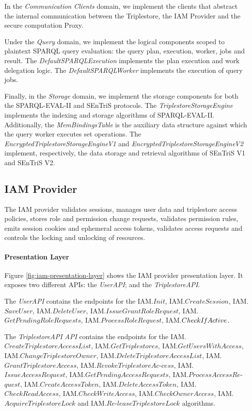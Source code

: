In the \emph{Communication Clients} domain, we implement the clients that abstract the internal communication between the Triplestore, the \gls{IAM} Provider and the secure computation Proxy.

Under the \emph{Query} domain, we implement the logical components scoped to plaintext \gls{SPARQL} query evaluation: the query plan, execution, worker, jobs and result. The \emph{DefaultSPARQLExecution} implements the plan execution and work delegation logic. The \emph{DefaultSPARQLWorker} implements the execution of query jobs.

Finally, in the \emph{Storage} domain, we implement the storage components for both the SPARQL-EVAL-II and \gls{SEnTriS} protocols. The \emph{TriplestoreStorageEngine} implements the indexing and storage algorithms of SPARQL-EVAL-II. Additionally, the \emph{MemBindingsTable} is the auxiliary data structure against which the query worker executes set operations.
The \emph{EncryptedTriplestoreStorageEngineV1} and \emph{EncryptedTriplestoreStorageEngineV2} implement, respectively, the data storage and retrieval algorithms of \gls{SEnTriS} V1 and \gls{SEnTriS} V2.

\subsection{IAM Provider} The \gls{IAM} provider validates sessions, manages user data and triplestore access policies, stores role and permission change requests, validates permission rules, emits session cookies and ephemeral access tokens, validates access requests and controls the locking and unlocking of resources.

\paragraph*{Presentation Layer} Figure \ref{fig:iam-presentation-layer} shows the \gls{IAM} provider presentation layer. It exposes two different \gls{API}s: the \emph{UserAPI}; and the \emph{TriplestoreAPI}.

The \emph{UserAPI} contains the endpoints for the IAM.$Init$, IAM.$CreateSession$, IAM.\linebreak$SaveUser$, IAM.$DeleteUser$, IAM.$IssueGrantRoleRequest$, IAM.$GetPendingRoleRequests$, IAM.$ProcessRoleRequest$, IAM.$CheckI\textrm{\emph{f}}Active$.

The \emph{TriplestoreAPI API} contains the endpoints for the IAM.$CreateTriplestoreAccessList$, IAM.$GetTriplestores$, IAM.$GetUsersWithAccess$, IAM.$ChangeTriplestoreOwner$, IAM.\linebreak$DeleteTriplestoreAccessList$, IAM.$GrantTriplestoreAccess$, IAM.$RevokeTriplestoreAc$\textrm{-}\linebreak$cess$, IAM.$IssueAccessRequest$, IAM.$GetPendingAccessRequests$, IAM.$ProcessAccessRe$\textrm{-}\linebreak$quest$, IAM.$CreateAccessToken$, IAM.$DeleteAccessToken$, IAM.$CheckReadAccess$, IAM.\linebreak$CheckWriteAccess$, IAM.$CheckOwnerAccess$, IAM.$AcquireTriplestoreLock$ and IAM.$Re$\textrm{-}\linebreak$leaseTriplestoreLock$ algorithms.

